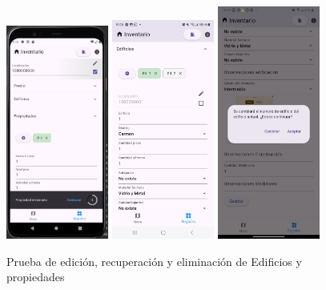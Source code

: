 \begin{figure}[h]
    \includegraphics[width=0.3\textwidth]{Graphics/Capitulo 4/Pixel 4 [emulador]/4.5/5.png}
    \includegraphics[width=0.3\textwidth]{Graphics/Capitulo 4/Galaxy S23 Ultra Android/4.5/1.jpg}
    \includegraphics[width=0.3\textwidth]{Graphics/Capitulo 4/LG Android 13/4.4/4.png}
    \caption{Prueba de edición, recuperación y eliminación de Edificios y propiedades}
    \label{fig:figura23}
\end{figure}

